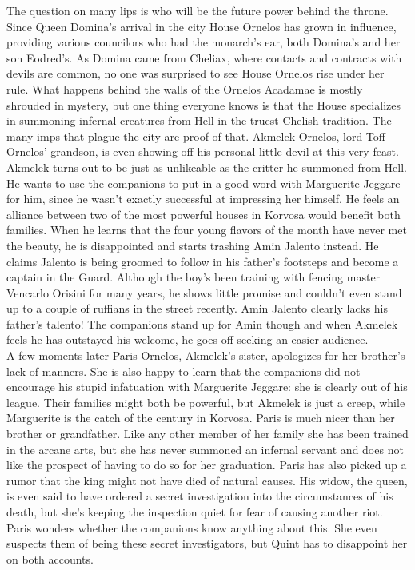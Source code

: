 The question on many lips is who will be the future power behind the throne. Since Queen Domina's arrival in the city House Ornelos has grown in influence, providing various councilors who had the monarch's ear, both Domina's and her son Eodred's. As Domina came from Cheliax, where contacts and contracts with devils are common, no one was surprised to see House Ornelos rise under her rule. What happens behind the walls of the Ornelos Acadamae is mostly shrouded in mystery, but one thing everyone knows is that the House specializes in summoning infernal creatures from Hell in the truest Chelish tradition. The many imps that plague the city are proof of that. Akmelek Ornelos, lord Toff Ornelos' grandson, is even showing off his personal little devil at this very feast.\\

Akmelek turns out to be just as unlikeable as the critter he summoned from Hell. He wants to use the companions to put in a good word with Marguerite Jeggare for him, since he wasn't exactly successful at impressing her himself. He feels an alliance between two of the most powerful houses in Korvosa would benefit both families. When he learns that the four young flavors of the month have never met the beauty, he is disappointed and starts trashing Amin Jalento instead. He claims Jalento is being groomed to follow in his father's footsteps and become a captain in the Guard. Although the boy's been training with fencing master Vencarlo Orisini for many years, he shows little promise and couldn't even stand up to a couple of ruffians in the street recently. Amin Jalento clearly lacks his father's talento! The companions stand up for Amin though and when Akmelek feels he has outstayed his welcome, he goes off seeking an easier audience.\\

A few moments later Paris Ornelos, Akmelek's sister, apologizes for her brother's lack of manners. She is also happy to learn that the companions did not encourage his stupid infatuation with Marguerite Jeggare: she is clearly out of his league. Their families might both be powerful, but Akmelek is just a creep, while Marguerite is the catch of the century in Korvosa. Paris is much nicer than her brother or grandfather. Like any other member of her family she has been trained in the arcane arts, but she has never summoned an infernal servant and does not like the prospect of having to do so for her graduation. Paris has also picked up a rumor that the king might not have died of natural causes. His widow, the queen, is even said to have ordered a secret investigation into the circumstances of his death, but she's keeping the inspection quiet for fear of causing another riot. Paris wonders whether the companions know anything about this. She even suspects them of being these secret investigators, but Quint has to disappoint her on both accounts.\\

